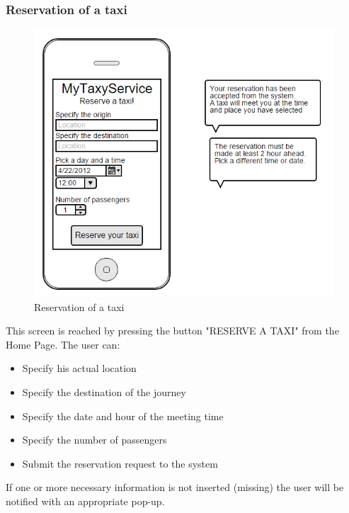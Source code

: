 \subsubsection{Reservation of a taxi}
\begin{figure}[H]
\centering
\includegraphics[scale=0.6]{Images/taxi_reservation}
\caption{Reservation of a taxi}
\end{figure}
This screen is reached by pressing the button "RESERVE A TAXI" from the Home Page. The user can:
\begin{itemize}
\item Specify his actual location
\item Specify the destination of the journey
\item Specify the date and hour of the meeting time
\item Specify the number of passengers
\item Submit the reservation request to the system
\end{itemize}
If one or more necessary information is not inserted (missing) the user will be notified with an appropriate pop-up.

